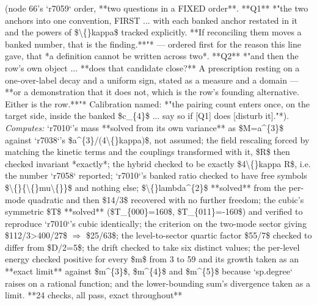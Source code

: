 \begin{description}
(node 66's `r7059` order, **two questions in a FIXED order**. **Q1** *"the two anchors into one convention, FIRST ... with each banked anchor restated in it and the powers of \$\textbackslash\{\}kappa\$ tracked explicitly. **If reconciling them moves a banked number, that is the finding.**"* --- ordered first for the reason this line gave, that *a definition cannot be written across two*. **Q2** *"and then the row's own object ... **does that candidate close?** A prescription resting on a one-over-label decay and a uniform sign, stated as a measure and a domain --- **or a demonstration that it does not, which is the row's founding alternative. Either is the row.**"* Calibration named: *"the pairing count enters once, on the target side, inside the banked \$c\_\{4\}\$ ... say so if [Q1] does [disturb it]."*). 
\emph{Computes:} `r7010`'s mass **solved from its own variance** as \$M=a\textasciicircum{}\{3\}\$ against `r7038`'s \$a\textasciicircum{}\{3\}/(4\textbackslash\{\}kappa)\$, not assumed; the field rescaling forced by matching the kinetic terms and the couplings transformed with it, \$R\$ then checked invariant *exactly*; the hybrid checked to be exactly \$4\textbackslash\{\}kappa R\$, i.e. the number `r7058` reported; `r7010`'s banked ratio checked to have free symbols \$\textbackslash\{\}\{\textbackslash\{\}mu\textbackslash\{\}\}\$ and nothing else; \$\textbackslash\{\}lambda\textasciicircum{}\{2\}\$ **solved** from the per-mode quadratic and then \$14/3\$ recovered with no further freedom; the cubic's symmetric \$T\$ **solved** (\$T\_\{000\}=160\$, \$T\_\{011\}=-160\$) and verified to reproduce `r7010`'s cubic identically; the criterion on the two-mode sector giving \$112/3>400/27\$ \ensuremath{\Rightarrow} \$25/63\$; the level-to-sector quartic factor \$55/7\$ checked to differ from \$D/2=5\$; the drift checked to take six distinct values; the per-level energy checked positive for every \$m\$ from 3 to 59 and its growth taken as an **exact limit** against \$m\textasciicircum{}\{3\}\$, \$m\textasciicircum{}\{4\}\$ and \$m\textasciicircum{}\{5\}\$ because `sp.degree` raises on a rational function; and the lower-bounding sum's divergence taken as a limit. **24 checks, all pass, exact throughout**

\end{description}
